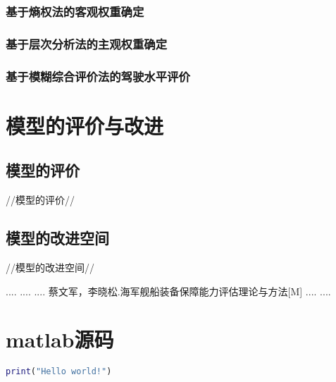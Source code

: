 \documentclass[bwprint]{cumcmthesis}
\begin{document}
            \subsubsection{基于熵权法的客观权重确定}
            \subsubsection{基于层次分析法的主观权重确定}
            \subsubsection{基于模糊综合评价法的驾驶水平评价}
    \section{模型的评价与改进}
    \subsection{模型的评价}
    //模型的评价//
    \subsection{模型的改进空间}
    //模型的改进空间//
    \begin{thebibliography}{9}
         ....
         ....
         ....
         蔡文军，李晓松.海军舰船装备保障能力评估理论与方法[M]
         ....
         ....
        
    \end{thebibliography}
    \newpage
    \appendix
        \section{matlab源码}
        \begin{lstlisting}[language=matlab]
            print("Hello world!")
        \end{lstlisting}
\end{document}
